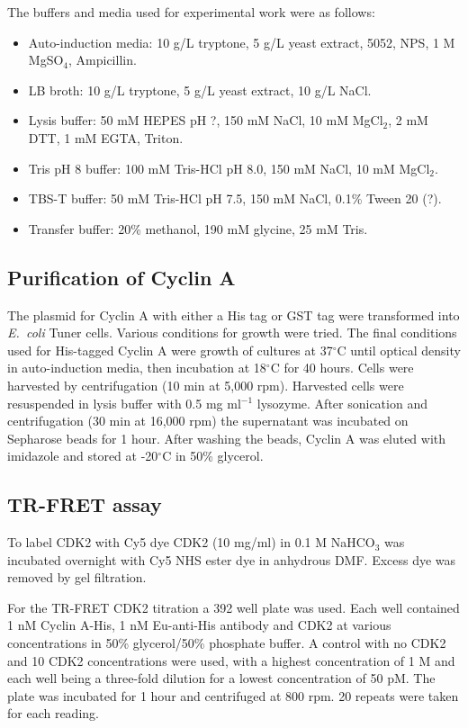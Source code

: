 The buffers and media used for experimental work were as follows:
\begin{itemize}
\item Auto-induction media: 10 g/L tryptone, 5 g/L yeast extract, 5052, NPS, 1 M MgSO$_{4}$, Ampicillin.
\item LB broth: 10 g/L tryptone, 5 g/L yeast extract, 10 g/L NaCl.
\item Lysis buffer: 50 mM HEPES pH ?, 150 mM NaCl, 10 mM MgCl$_{2}$, 2 mM DTT, 1 mM EGTA, Triton.
\item Tris pH 8 buffer: 100 mM Tris-HCl pH 8.0, 150 mM NaCl, 10 mM MgCl$_{2}$.
\item TBS-T buffer: 50 mM Tris-HCl pH 7.5, 150 mM NaCl, 0.1\% Tween 20 (?).
\item Transfer buffer: 20\% methanol, 190 mM glycine, 25 mM Tris.
\end{itemize}


\subsection{Purification of Cyclin A}

The plasmid for Cyclin A with either a His tag or GST tag were transformed into \textit{E.\ coli} Tuner cells.
Various conditions for growth were tried.
The final conditions used for His-tagged Cyclin A were growth of cultures at 37$^{\circ}$C until optical density in auto-induction media, then incubation at 18$^{\circ}$C for 40 hours.
Cells were harvested by centrifugation (10 min at 5,000 rpm).
Harvested cells were resuspended in lysis buffer with 0.5 mg ml$^{-1}$ lysozyme.
After sonication and centrifugation (30 min at 16,000 rpm) the supernatant was incubated on Sepharose beads for 1 hour.
After washing the beads, Cyclin A was eluted with imidazole and stored at -20$^{\circ}$C in 50\% glycerol.


\subsection{TR-FRET assay}

To label CDK2 with Cy5 dye CDK2 (10 mg/ml) in 0.1 M NaHCO$_{3}$ was incubated overnight with Cy5 NHS ester dye in anhydrous DMF.
Excess dye was removed by gel filtration.

For the TR-FRET CDK2 titration a 392 well plate was used.
Each well contained 1 nM Cyclin A-His, 1 nM Eu-anti-His antibody and CDK2 at various concentrations in 50\% glycerol/50\% phosphate buffer.
A control with no CDK2 and 10 CDK2 concentrations were used, with a highest concentration of 1 \textmu M and each well being a three-fold dilution for a lowest concentration of 50 pM.
The plate was incubated for 1 hour and centrifuged at 800 rpm.
20 repeats were taken for each reading.


